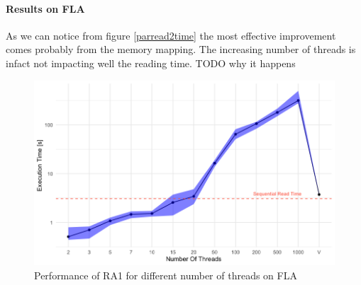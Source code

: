 \documentclass[twocolumn, switch]{article} %
\begin{document}
\paragraph{Results on FLA} 
As we can notice from figure \ref{parread2time} the most effective improvement comes probably from
the memory mapping. The increasing number of threads is infact not impacting well the reading time.
TODO why it happens
\begin{figure}[ht!]
  \centering
  \includegraphics[width=1\linewidth]{read/par_read_1_time.png}
  \caption{Performance of RA1 for different number of threads on FLA}
  \label{parread1time}
\end{figure}
\end{document}
